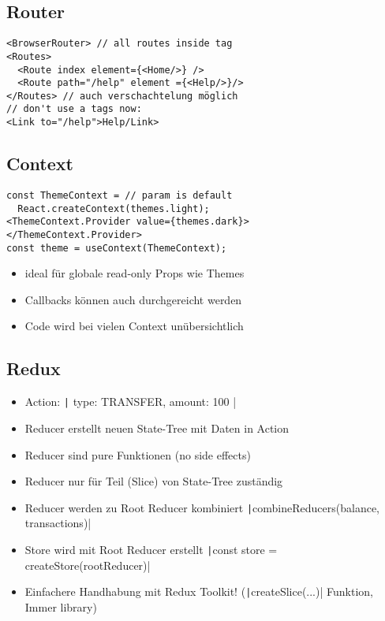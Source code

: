 \begin{multicols*}{2}
\subsection{Router}
\begin{verbatim}
<BrowserRouter> // all routes inside tag
<Routes>
  <Route index element={<Home/>} />
  <Route path="/help" element ={<Help/>}/>
</Routes> // auch verschachtelung möglich
// don't use a tags now:
<Link to="/help">Help/Link>
\end{verbatim}

\subsection{Context}
\begin{verbatim}
const ThemeContext = // param is default
  React.createContext(themes.light);
<ThemeContext.Provider value={themes.dark}>
</ThemeContext.Provider>
const theme = useContext(ThemeContext);
\end{verbatim}
\begin{itemize}
    \item ideal für globale read-only Props wie Themes
    \item Callbacks können auch durchgereicht werden
    \item Code wird bei vielen Context unübersichtlich
\end{itemize}

\subsection{Redux}
\begin{itemize}
    \item Action: \texttt|{ type: TRANSFER, amount: 100 }|
    \item Reducer erstellt neuen State-Tree mit Daten in Action
    \item Reducer sind pure Funktionen (no side effects)
    \item Reducer nur für Teil (Slice) von State-Tree zuständig
    \item Reducer werden zu Root Reducer kombiniert \texttt|combineReducers({balance, transactions})|
    \item Store wird mit Root Reducer erstellt \texttt|const store = createStore(rootReducer)|
    \item Einfachere Handhabung mit Redux Toolkit! (\texttt|createSlice({...})| Funktion, Immer library)
\end{itemize}


\end{multicols*}
